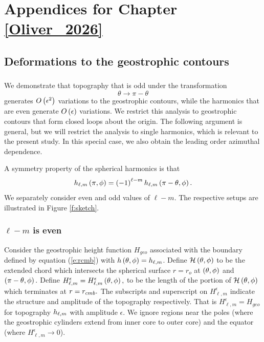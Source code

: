 \chapter{Appendices for Chapter \ref{Oliver_2026}}
\section{Deformations to the geostrophic contours}
\label{a:oddveven}
\subsection*{}
\noindent

We demonstrate that topography that is odd under the transformation \[\theta\rightarrow \pi - \theta\]
generates $O\left ( \epsilon^{2}\right ) $ variations to the geostrophic contours, while the harmonics that are even generate $O\left ( \epsilon\right ) $ variations. 
We restrict this analysis to geostrophic contours that form closed loops about the origin.
The following argument is general, but we will restrict the analysis to single harmonics, which is relevant to the present study. 
In this special case, we also obtain the leading order azimuthal dependence.

A symmetry property of the spherical harmonics is that
\[h_{\ell,m}\left ( \pi,\phi\right ) = \left ( -1\right ) ^{\ell - m}h_{\ell,m}\left ( \pi-\theta,\phi\right ).\] 
We separately consider even and odd values of $\ell - m.$ The respective setups are illustrated in Figure \ref{f:sketch}.
\subsection*{$\ell - m$ is even}
Consider the geostrophic height function $H_{geo}$ associated with the boundary defined by equation (\ref{e:rcmb}) with $h\left ( \theta,\phi\right ) =h_{\ell,m}$. 
Define $\mathcal{H}\left ( \theta,\phi\right ) $ to be the extended chord which intersects the spherical surface $r=r_{o}$ at $\left ( \theta,\phi\right ) $ and $\left ( \pi-\theta,\phi\right ).$  
Define $H_{\ell,m}^{\epsilon} = H_{\ell,m}^{\epsilon}\left ( \theta,\phi\right ), $ to be the length of the portion of $\mathcal{H}\left ( \theta,\phi\right ) $ which terminates at $r = { {r_{cmb}}}.$
The subscripts and superscript on $H_{\ell,m}^{\epsilon}$ indicate the structure and amplitude of the topography respectively. That is $H_{\ell,m}^{\epsilon} = H_{geo}$ for topography $h_{\ell,m}$ with amplitude $\epsilon .$
We ignore regions near the poles (where the geostrophic cylinders extend from inner core to outer core) and the equator (where $H_{\ell,m}^{\epsilon}\rightarrow0$). 

